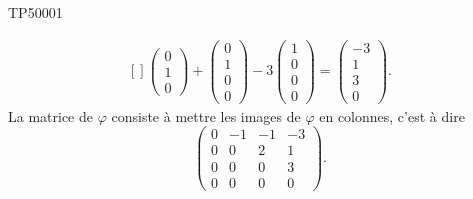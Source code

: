 \begin{corrige}{TP50001}
\begin{enumerate}
\begin{equation}
\begin{aligned}[]
\begin{pmatrix}
						0	\\ 
						1	\\ 
						0	
					\end{pmatrix}+\begin{pmatrix}
						0	\\ 
						1	\\ 
						0	\\ 
						0	
					\end{pmatrix}-3\begin{pmatrix}
						1	\\ 
						0	\\ 
						0	\\ 
						0	
					\end{pmatrix}=\begin{pmatrix}
						-3	\\ 
						1	\\ 
						3	\\ 
						0	
					\end{pmatrix}.
				\end{aligned}
			\end{equation}
			La matrice de $\varphi$ consiste à mettre les images de $\varphi$ en colonnes, c'est à dire
			\begin{equation}
				\begin{pmatrix}
					 0	&	-1	&	-1	&	-3	\\
					 0	&	0	&	2	&	1	\\
					 0	&	0	&	0	&	3	\\ 
					 0	&	0	&	0	&	0	 
					  \end{pmatrix}.
			\end{equation}
			

	\end{enumerate}

\end{corrige}
